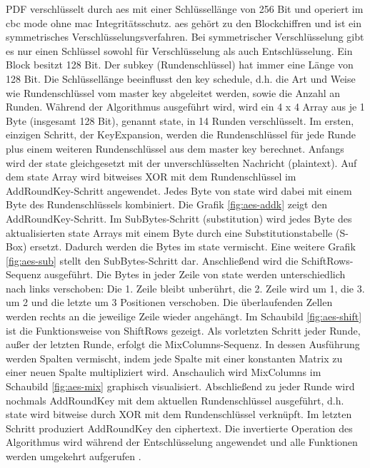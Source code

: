 PDF verschlüsselt durch \gls{aes} mit einer Schlüssellänge von 256 Bit und operiert im \gls{cbc} mode ohne \gls{mac} Integritätsschutz. \gls{aes} gehört zu den Blockchiffren und ist ein symmetrisches Verschlüsselungsverfahren. Bei symmetrischer Verschlüsselung gibt es nur einen Schlüssel sowohl für Verschlüsselung als auch Entschlüsselung. Ein Block besitzt 128 Bit. Der subkey (Rundenschlüssel) hat immer eine Länge von 128 Bit. Die Schlüssellänge beeinflusst den key schedule, d.h. die Art und Weise wie Rundenschlüssel vom master key abgeleitet werden, sowie die Anzahl an Runden. Während der Algorithmus ausgeführt wird, wird ein 4 x 4 Array aus je 1 Byte (insgesamt 128 Bit), genannt state, in 14 Runden verschlüsselt. Im ersten, einzigen Schritt, der KeyExpansion, werden die Rundenschlüssel für jede Runde plus einem weiteren Rundenschlüssel aus dem master key berechnet. Anfangs wird der state gleichgesetzt mit der unverschlüsselten Nachricht (plaintext). Auf dem state Array wird bitweises XOR mit dem Rundenschlüssel im AddRoundKey-Schritt angewendet. Jedes Byte von state wird dabei mit einem Byte des Rundenschlüssels kombiniert. Die Grafik \ref{fig:aes-addk} zeigt den AddRoundKey-Schritt. Im SubBytes-Schritt (substitution) wird jedes Byte des aktualisierten state Arrays mit einem Byte durch eine Substitutionstabelle (S-Box) ersetzt. Dadurch werden die Bytes im state vermischt. Eine weitere Grafik \ref{fig:aes-sub} stellt den SubBytes-Schritt dar. Anschließend wird die SchiftRows-Sequenz ausgeführt. Die Bytes in jeder Zeile von state werden unterschiedlich nach links verschoben: Die 1. Zeile bleibt unberührt, die 2. Zeile wird um 1, die 3. um 2 und die letzte um 3 Positionen verschoben. Die überlaufenden Zellen werden rechts an die jeweilige Zeile wieder angehängt. Im Schaubild \ref{fig:aes-shift} ist die Funktionsweise von ShiftRows gezeigt. Als vorletzten Schritt jeder Runde, außer der letzten Runde, erfolgt die MixColumns-Sequenz. In dessen Ausführung werden Spalten vermischt, indem jede Spalte mit einer konstanten Matrix zu einer neuen Spalte multipliziert wird. Anschaulich wird MixColumns im Schaubild \ref{fig:aes-mix} graphisch visualisiert. Abschließend zu jeder Runde wird nochmals AddRoundKey mit dem aktuellen Rundenschlüssel ausgeführt, d.h. state wird bitweise durch XOR mit dem Rundenschlüssel verknüpft. Im letzten Schritt produziert AddRoundKey den ciphertext. Die invertierte Operation des Algorithmus wird während der Entschlüsselung angewendet und alle Funktionen werden umgekehrt aufgerufen \cite{intro-crypto, studyflix-aes, simply-aes}. \\

